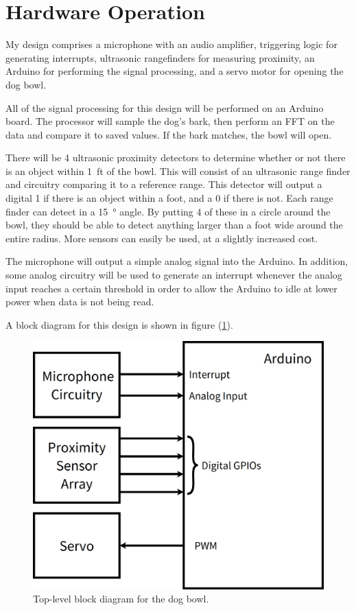 \documentclass[10pt]{article}           %
\begin{document}
\section{Hardware Operation}
\label{sec:operation}

My design comprises a microphone with an audio amplifier, triggering logic for
generating interrupts, ultrasonic rangefinders for measuring proximity, an
Arduino for performing the signal processing, and a servo motor for opening the
dog bowl.

All of the signal processing for this design will be performed on an Arduino
board. The processor will sample the dog's bark, then perform an FFT on the data
and compare it to saved values. If the bark matches, the bowl will open.

There will be 4 ultrasonic proximity detectors to determine whether or not there
is an object within \SI{1}{ft} of the bowl. This will consist of an ultrasonic
range finder and circuitry comparing it to a reference range. This detector will
output a digital 1 if there is an object within a foot, and a 0 if there is not.
Each range finder can detect in a \SI{15}{\degree} angle. By putting 4 of these
in a circle around the bowl, they should be able to detect anything larger than
a foot wide around the entire radius. More sensors can easily be used, at a
slightly increased cost.

The microphone will output a simple analog signal into the Arduino. In addition,
some analog circuitry will be used to generate an interrupt whenever the analog
input reaches a certain threshold in order to allow the Arduino to idle at lower
power when data is not being read.

A block diagram for this design is shown in figure (\ref{fig:diagram}).

\begin{figure}[h]
    \centering
    \includegraphics[width=0.4\linewidth]{sch/top-level.png}
    \caption{Top-level block diagram for the dog bowl.}
\label{fig:diagram}
\end{figure}
\end{document}
